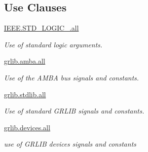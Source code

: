 \subsection*{Use Clauses}
 \begin{DoxyCompactItemize}
\item 
\hypertarget{classbutton__and__hex__wrapper_a68c233289eaf7d2601307bdd93b4c299}{\hyperlink{classbutton__and__hex__wrapper_a68c233289eaf7d2601307bdd93b4c299}{I\-E\-E\-E.\-S\-T\-D\-\_\-\-L\-O\-G\-I\-C\-\_.\-all}   }\label{classbutton__and__hex__wrapper_a68c233289eaf7d2601307bdd93b4c299}

\begin{DoxyCompactList}\small\item\em Use of standard logic arguments. \end{DoxyCompactList}\item 
\hypertarget{classbutton__and__hex__wrapper_a543ad46b77c6dc7048df8e72163d311d}{\hyperlink{classbutton__and__hex__wrapper_a543ad46b77c6dc7048df8e72163d311d}{grlib.\-amba.\-all}   }\label{classbutton__and__hex__wrapper_a543ad46b77c6dc7048df8e72163d311d}

\begin{DoxyCompactList}\small\item\em Use of the A\-M\-B\-A bus signals and constants. \end{DoxyCompactList}\item 
\hypertarget{classbutton__and__hex__wrapper_a8290b68c465332cd784781f7230e772d}{\hyperlink{classbutton__and__hex__wrapper_a8290b68c465332cd784781f7230e772d}{grlib.\-stdlib.\-all}   }\label{classbutton__and__hex__wrapper_a8290b68c465332cd784781f7230e772d}

\begin{DoxyCompactList}\small\item\em Use of standard G\-R\-L\-I\-B signals and constants. \end{DoxyCompactList}\item 
\hypertarget{classbutton__and__hex__wrapper_ad24672e694b1bed181a8b2813b132538}{\hyperlink{classbutton__and__hex__wrapper_ad24672e694b1bed181a8b2813b132538}{grlib.\-devices.\-all}   }\label{classbutton__and__hex__wrapper_ad24672e694b1bed181a8b2813b132538}

\begin{DoxyCompactList}\small\item\em use of G\-R\-L\-I\-B devices signals and constants \end{DoxyCompactList}\end{DoxyCompactItemize}
